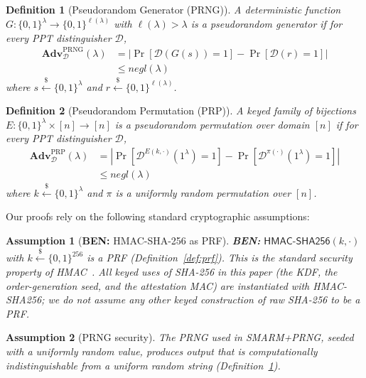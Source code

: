 \documentclass{ieeeaccess}
\DeclareRobustCommand{\ben}[1]{{\color{BENcolor}\textbf{BEN:} #1}}
\newcommand{\rtsmarmone}{SMARM+PRNG\xspace}
\newtheorem{definition}{Definition}
\newtheorem{assumption}{Assumption}[section]
\newcommand{\Adv}{\mathbf{Adv}}
\begin{document}
\begin{definition}[Pseudorandom Generator (PRNG)]
\label{def:prng}
A deterministic function $G : \{0,1\}^{\lambda} \to \{0,1\}^{\ell(\lambda)}$
with $\ell(\lambda) > \lambda$ is a \emph{pseudorandom generator} if for
every PPT distinguisher $\mathcal{D}$,
\[
\begin{aligned}
  \Adv^{\mathrm{PRNG}}_{\mathcal{D}}(\lambda)
  &=
  \left|
    \Pr\!\left[\mathcal{D}(G(s)) = 1\right]
    -
    \Pr\!\left[\mathcal{D}(r) = 1\right]
  \right| \\
  &\leq \mathit{negl}(\lambda)
\end{aligned}
\]
where $s \xleftarrow{\$} \{0,1\}^{\lambda}$ and
$r \xleftarrow{\$} \{0,1\}^{\ell(\lambda)}$.
\end{definition}
 
\begin{definition}[Pseudorandom Permutation (PRP)]
\label{def:prp}
A keyed family of bijections
$E : \{0,1\}^{\lambda} \times [n] \to [n]$
is a \emph{pseudorandom permutation} over domain $[n]$ if for every
PPT distinguisher $\mathcal{D}$,
\[
\begin{aligned}
  \Adv^{\mathrm{PRP}}_{\mathcal{D}}(\lambda)
  &=
  \left|
    \Pr\!\left[\mathcal{D}^{E(k,\cdot)}(1^{\lambda}) = 1\right]
    -
    \Pr\!\left[\mathcal{D}^{\pi(\cdot)}(1^{\lambda}) = 1\right]
  \right|\\
  &\leq \mathit{negl}(\lambda)
\end{aligned}
\]
where $k \xleftarrow{\$} \{0,1\}^{\lambda}$ and $\pi$ is a uniformly random
permutation over $[n]$.
\end{definition}
 
Our proofs rely on the following standard cryptographic assumptions:
 
\begin{assumption}[\ben{HMAC-SHA-256 as PRF}]
\label{asm:sha256-prf}
\ben{$\mathsf{HMAC\text{-}SHA256}(k,\cdot)$ with $k \xleftarrow{\$} \{0,1\}^{256}$ is a PRF (Definition~\ref{def:prf}).
This is the standard security property of HMAC~\cite{bellare1996new,bellare2006hmac}.
All keyed uses of SHA-256 in this paper (the KDF, the order-generation seed, and the attestation MAC) are instantiated with HMAC-SHA256; we do not assume any other keyed construction of raw SHA-256 to be a PRF.}
\end{assumption}
 
\begin{assumption}[PRNG security]
\label{asm:prng}
The PRNG used in \rtsmarmone, seeded with a uniformly random value, produces
output that is computationally indistinguishable from a uniform random string
(Definition~\ref{def:prng}).
\end{assumption}
 
\end{document}
